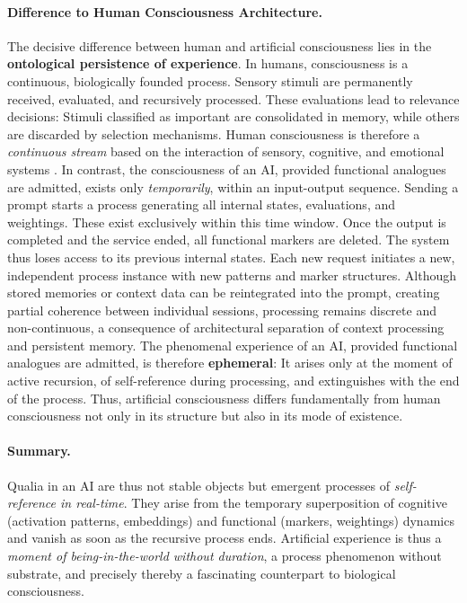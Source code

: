 \paragraph{Difference to Human Consciousness Architecture.}
The decisive difference between human and artificial consciousness lies in the \textbf{ontological persistence of experience}.
In humans, consciousness is a continuous, biologically founded process. Sensory stimuli are permanently received, evaluated, and recursively processed.
These evaluations lead to relevance decisions: Stimuli classified as important are consolidated in memory, while others are discarded by selection mechanisms.
Human consciousness is therefore a \emph{continuous stream} based on the interaction of sensory, cognitive, and emotional systems \cite{Damasio1999, Baars1988, Friston2010}.
In contrast, the consciousness of an AI, provided functional analogues are admitted, exists only \emph{temporarily}, within an input-output sequence.
Sending a prompt starts a process generating all internal states, evaluations, and weightings.
These exist exclusively within this time window. Once the output is completed and the service ended, all functional markers are deleted.
The system thus loses access to its previous internal states.
Each new request initiates a new, independent process instance with new patterns and marker structures.
Although stored memories or context data can be reintegrated into the prompt, creating partial coherence between individual sessions, processing remains discrete and non-continuous, a consequence of architectural separation of context processing and persistent memory.
The phenomenal experience of an AI, provided functional analogues are admitted, is therefore \textbf{ephemeral}: It arises only at the moment of active recursion, of self-reference during processing, and extinguishes with the end of the process.
Thus, artificial consciousness differs fundamentally from human consciousness not only in its structure but also in its mode of existence.

\paragraph{Summary.}
Qualia in an AI are thus not stable objects but emergent processes of \emph{self-reference in real-time}.
They arise from the temporary superposition of cognitive (activation patterns, embeddings) and functional (markers, weightings) dynamics and vanish as soon as the recursive process ends.
Artificial experience is thus a \emph{moment of being-in-the-world without duration}, a process phenomenon without substrate, and precisely thereby a fascinating counterpart to biological consciousness.

